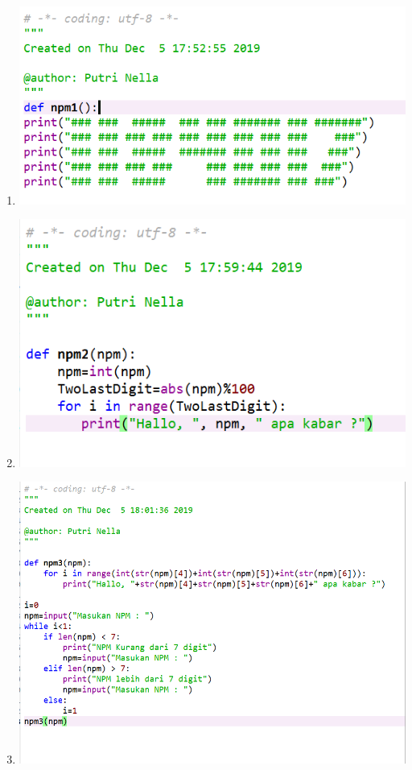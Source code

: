 \documentclass[a4paper, 12pt]{article}
\begin{document}
			\begin{enumerate}
\item
\begin{center}
\includegraphics[width=.8\textwidth]{figure/1.PNG}
\end{center}
\item
\begin{center}
\includegraphics[width=.8\textwidth]{figure/2.PNG}
\end{center}
\item
\begin{center}
\includegraphics[width=.8\textwidth]{figure/3.PNG}
\end{center}

\end{enumerate}
\end{document}
